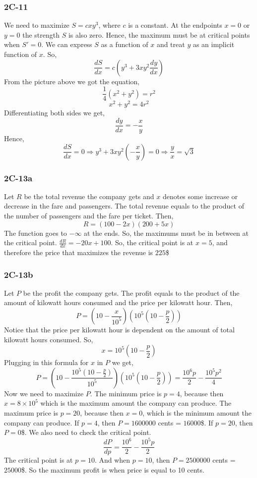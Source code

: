\documentclass{article}
\begin{document}
\newpage
\subsubsection{2C-11}
\begin{figure}[htp!]
    \centering
    
    \label{fig:fig2}
\end{figure}
We need to maximize $S = cxy^3$, where $c$ is a constant. At the endpoints $x = 0$ or $y = 0$ the strength $S$ is also zero. Hence, the maximum must be at critical points when $S' = 0$. We can express $S$ as a function of $x$ and treat $y$ as an implicit function of $x$. So, 
\[\frac{dS}{dx} = c\left(y^3+3xy^2\frac{dy}{dx}\right)\] 
From the picture above we got the equation,
\[ \frac{1}{4} \left(x^2 + y^2\right) = r^2 \]
\[ x^2 + y^2 = 4r^2 \]
Differentiating both sides we get,
\[ \frac{dy}{dx} = -\frac{x}{y} \]
Hence,
\[ \frac{dS}{dx} = 0 \Rightarrow y^3 + 3xy^2\left( -\frac{x}{y} \right) = 0 \Rightarrow \frac{y}{x} = \sqrt{3} \]

\subsubsection{2C-13a}
Let $R$ be the total revenue the company gets and $x$ denotes some increase or decrease in the fare and passengers. The total revenue equals to the product of the number of passengers and the fare per ticket. Then,
\[ R = (100-2x)(200+5x) \]
The function goes to $-\infty$ at the ends. So, the maximums must be in between at the critical point. $\frac{dR}{dx} = -20x + 100$. So, the critical point is at $x = 5$, and therefore the price that maximizes the revenue is $225$\$

\subsubsection{2C-13b}
Let $P$ be the profit the company gets. The profit equals to the product of the amount of kilowatt hours consumed and the price per kilowatt hour. Then,
\[ P = \left( 10-\frac{x}{10^5} \right) \left( 10^5 \left( 10 - \frac{p}{2} \right) \right) \]
Notice that the price per kilowatt hour is dependent on the amount of total kilowatt hours consumed. So,
\[ x = 10^5 \left( 10 - \frac{p}{2} \right)\]
Plugging in this formula for $x$ in $P$ we get,
\[ P = \left( 10-\frac{10^5 \left( 10 - \frac{p}{2} \right)}{10^5} \right) \left( 10^5 \left( 10 - \frac{p}{2} \right) \right) = \frac{10^6p}{2} - \frac{10^5p^2}{4} \]
Now we need to maximize $P$. The minimum price is $p = 4$, because then $x = 8 \times 10^5$ which is the maximum amount the company can produce. The maximum price is $p = 20$, because then $x = 0$, which is the minimum amount the company can produce. If $p = 4$, then $P = 1600000$ cents = $16000$\$. If $p = 20$, then $P = 0$\$. We also need to check the critical point.
\[ \frac{dP}{dp} = \frac{10^6}{2} - \frac{10^5p}{2} \]
The critical point is at $p = 10$. And when $p = 10$, then $P = 2500000$ cents =  $25000$\$. So the maximum profit is when price is equal to 10 cents.
\end{document}
